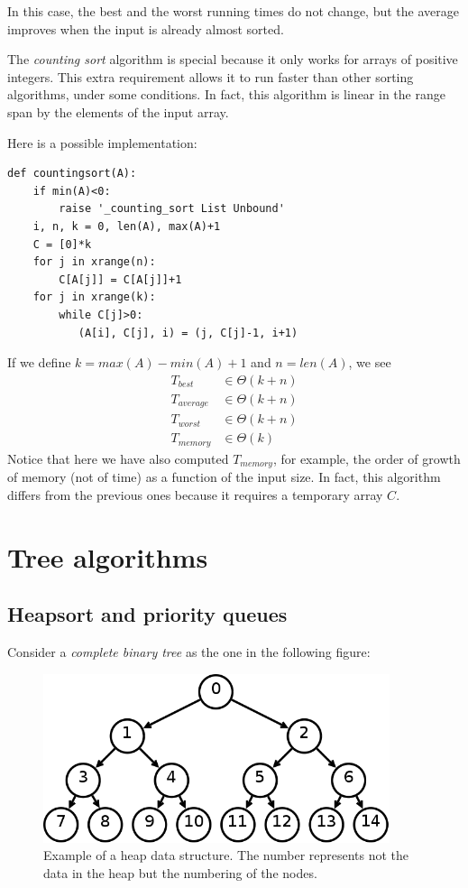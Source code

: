 \documentclass[justified,sixbynine]{tufte-book}
\theoremstyle{plain}%
\theoremstyle{definition}
\theoremstyle{remark}
\begin{document}
\begin{fullwidth}
In this case, the best and the worst running times do not change, but the average improves when the input is already almost sorted.


The {\it counting sort} algorithm is special because it only works for arrays of positive integers. This extra requirement allows it to run faster than other sorting algorithms, under some conditions. In fact, this algorithm is linear in the range span by the elements of the input array.

Here is a possible implementation:
\begin{lstlisting}
def countingsort(A):
    if min(A)<0:
        raise '_counting_sort List Unbound'
    i, n, k = 0, len(A), max(A)+1
    C = [0]*k
    for j in xrange(n):
        C[A[j]] = C[A[j]]+1
    for j in xrange(k):
        while C[j]>0:
           (A[i], C[j], i) = (j, C[j]-1, i+1)
\end{lstlisting}

If we define $k=max(A)-min(A)+1$ and $n=len(A)$, we see
\begin{align}
T_{best} &\in \Theta (k+n) \\
T_{average} &\in \Theta (k+n) \\
T_{worst} &\in \Theta (k+n) \\
T_{memory} &\in \Theta (k)
\end{align}
Notice that here we have also computed $T_{memory}$, for example, the order of growth of memory (not of time) as a function of the input size. In fact, this algorithm differs from the previous ones because it requires a temporary array $C$.

\goodbreak\section{Tree algorithms}


\goodbreak\subsection{Heapsort and priority queues}


Consider a {\it complete binary tree} as the one in the following figure:

\begin{figure}[ht]
\centering\includegraphics[width=4in]{images/heap.png}
\caption{Example of a heap data structure. The number represents not the data in the heap but the numbering of the nodes.}
\end{figure}


\end{fullwidth}
\end{document}
